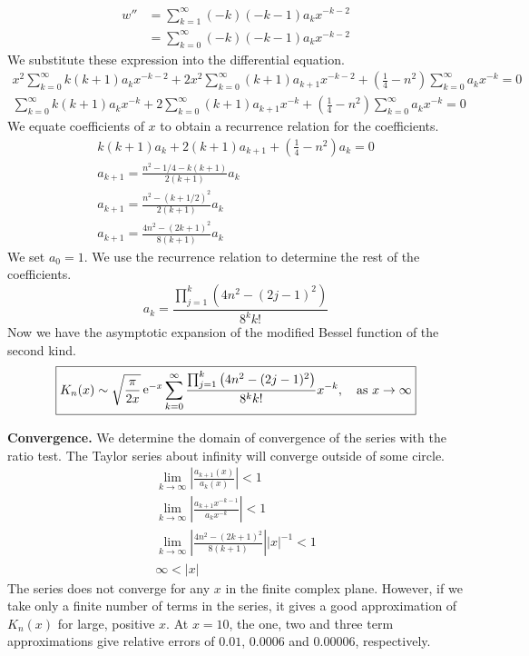 {\begin{Solution}
\begin{align*}
    \\
    w'' &= \sum_{k=1}^\infty (-k)(-k-1) a_k x^{-k-2}
    \\
    &= \sum_{k = 0}^\infty (-k)(-k-1) a_k x^{-k-2}
  \end{align*}
  We substitute these expression into the differential equation.
  \begin{gather*}
    x^2 \sum_{k = 0}^\infty k(k+1) a_k x^{-k-2} + 2 x^2 \sum_{k = 0}^\infty (k+1) a_{k+1} x^{-k-2} 
    + \left( \frac{1}{4} - n^2 \right) \sum_{k = 0}^\infty a_k x^{-k} = 0 
    \\
    \sum_{k = 0}^\infty k(k+1) a_k x^{-k} + 2 \sum_{k = 0}^\infty (k+1) a_{k+1} x^{-k} 
    + \left( \frac{1}{4} - n^2 \right) \sum_{k = 0}^\infty a_k x^{-k} = 0 
  \end{gather*}
  We equate coefficients of $x$ to obtain a recurrence relation for the 
  coefficients.
  \begin{gather*}
    k(k+1) a_k + 2 (k+1) a_{k+1} + \left( \frac{1}{4} - n^2 \right) a_k = 0 
    \\
    a_{k+1} = \frac{ n^2 - 1/4 - k(k+1) }{ 2 (k+1) } a_k 
    \\
    a_{k+1} = \frac{ n^2 - (k+1/2)^2 }{ 2 (k+1) } a_k 
    \\
    a_{k+1} = \frac{ 4 n^2 - (2 k+1)^2 }{ 8 (k+1) } a_k  
  \end{gather*}
  We set $a_0 = 1$.  We use the recurrence relation to determine the 
  rest of the coefficients.
  \[
  a_k = \frac{ \prod_{j=1}^k \left( 4n^2 - (2 j - 1)^2 \right) }{ 8^k k! }
  \]
  Now we have the asymptotic expansion of the modified Bessel function 
  of the second kind.
  \[
  \boxed{
    K_n(x) \sim \sqrt{ \frac{\pi}{2 x} } \mathop{\mathrm{e}}\nolimits^{- x} 
    \sum_{k = 0}^\infty \frac{ \prod_{j=1}^k \left( 4n^2 - (2 j - 1)^2 \right) }{ 8^k k! } x^{-k},
    \quad \mathrm{as}\ x \to \infty
    }
  \]


  \textbf{Convergence.}
  We determine the domain of convergence of the series with the ratio test.
  The Taylor series about infinity will converge outside of some circle.
  \begin{gather*}
    \lim_{k \to \infty} \left| \frac{a_{k+1}(x)}{ a_k(x) } \right| < 1 
    \\
    \lim_{k \to \infty} \left| \frac{a_{k+1} x^{-k-1} }{ a_k x^{-k} } \right| < 1
    \\
    \lim_{k \to \infty} \left| 
      \frac{ 4 n^2 - (2 k+1)^2 }{ 8 (k+1) } \right| |x|^{-1} < 1
    \\
    \infty < |x|
  \end{gather*}
  The series does not converge for any $x$ in the finite complex plane.  
  However, if we take only a finite number of terms in the series, it gives
  a good approximation of $K_n(x)$ for large, positive $x$.  At $x = 10$, 
  the one, two and three term approximations give relative errors of 
  $0.01$, $0.0006$ and $0.00006$, respectively.
\end{Solution}




\raggedbottom
}
